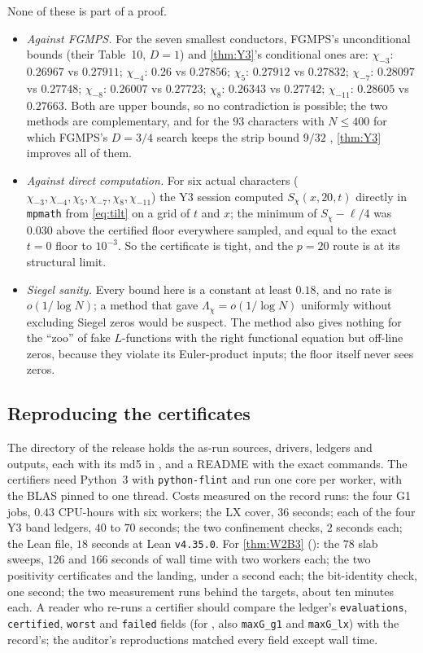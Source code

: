 \documentclass[11pt]{article}
\theoremstyle{definition}
\newcommand{\lean}[1]{\texttt{#1}}
\newcommand{\Lc}{\Lambda}
\begin{document}
None of these is part of a proof.
\begin{itemize}
\item \emph{Against FGMPS.} For the seven smallest conductors, FGMPS's unconditional bounds (their Table~10, $D = 1$) and \cref{thm:Y3}'s conditional ones are: $\chi_{-3}$: $0.26967$ vs $0.27911$; $\chi_{-4}$: $0.26$ vs $0.27856$; $\chi_5$: $0.27912$ vs $0.27832$; $\chi_{-7}$: $0.28097$ vs $0.27748$; $\chi_{-8}$: $0.26007$ vs $0.27723$; $\chi_8$: $0.26343$ vs $0.27742$; $\chi_{-11}$: $0.28605$ vs $0.27663$. Both are upper bounds, so no contradiction is possible; the two methods are complementary, and for the $93$ characters with $N \le 400$ for which FGMPS's $D = 3/4$ search keeps the strip bound $9/32$ \cite[\S7.7]{FGMPS2026}, \cref{thm:Y3} improves all of them.
\item \emph{Against direct computation.} For six actual characters ($\chi_{-3}, \chi_{-4}, \chi_5, \chi_{-7}, \chi_8, \chi_{-11}$) the Y3 session computed $S_\chi(x, 20, t)$ directly in \lean{mpmath} from \eqref{eq:tilt} on a grid of $t$ and $x$; the minimum of $S_\chi - \ell/4$ was $0.030$ above the certified floor everywhere sampled, and equal to the exact $t = 0$ floor to $10^{-3}$. So the certificate is tight, and the $p = 20$ route is at its structural limit.
\item \emph{Siegel sanity.} Every bound here is a constant at least $0.18$, and no rate is $o(1/\log N)$; a method that gave $\Lc_\chi = o(1/\log N)$ uniformly without excluding Siegel zeros would be suspect. The method also gives nothing for the ``zoo'' of fake $L$-functions with the right functional equation but off-line zeros, because they violate its Euler-product inputs; the floor itself never sees zeros.
\end{itemize}

\subsection{Reproducing the certificates}\label{sec:v2repro}

The  directory of the release holds the as-run sources, drivers, ledgers and outputs, each with its md5 in , and a README with the exact commands. The certifiers need Python~3 with \lean{python-flint} and run one core per worker, with the BLAS pinned to one thread. Costs measured on the record runs: the four G1 jobs, $0.43$ CPU-hours with six workers; the LX cover, $36$ seconds; each of the four Y3 band ledgers, $40$ to $70$ seconds; the two confinement checks, $2$ seconds each; the Lean file, $18$ seconds at Lean \lean{v4.35.0}. For \cref{thm:W2B3} (): the $78$ slab sweeps, $126$ and $166$ seconds of wall time with two workers each; the two positivity certificates and the landing, under a second each; the bit-identity check, one second; the two measurement runs behind the targets, about ten minutes each. A reader who re-runs a certifier should compare the ledger's \lean{evaluations}, \lean{certified}, \lean{worst} and \lean{failed} fields (for , also \lean{maxG\_g1} and \lean{maxG\_lx}) with the record's; the auditor's reproductions matched every field except wall time.
\end{document}

